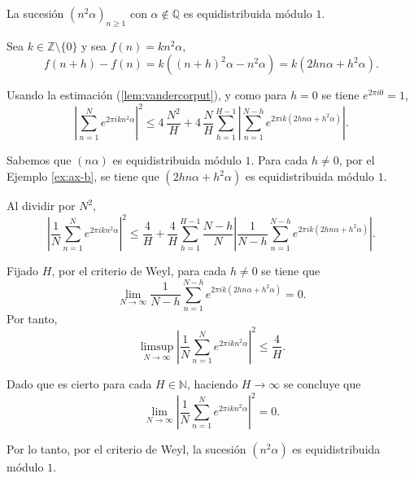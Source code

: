 \begin{example}
    La sucesión $(n^2\alpha)_{n\geq1}$ con $\alpha \notin \mathbb{Q}$ es equidistribuida 
    módulo $1$.
\end{example}

\begin{resolve}
    Sea $k \in \mathbb{Z}\setminus\{0\}$ y sea $f(n)=kn^2\alpha$,
    \[
        f(n+h)-f(n) =
        k((n+h)^2\alpha - n^2\alpha) = 
        k(2hn\alpha + h^2\alpha).
    \]

    Usando la estimación (\ref{lem:vandercorput}), y como para $h=0$ se tiene $e^{2\pi i 0}=1$, 
    \[
        \left|\sum_{n=1}^N e^{2\pi i  k n^2 \alpha}\right|^2 \leq 
        4\,\frac{N^2}{H} + 4\,\frac{N}{H} \sum_{h=1}^{H-1} \left|\sum_{n=1}^{N-h} e^{2\pi i k (2hn\alpha+h^2\alpha)}\right|.
    \]

    Sabemos que $(n\alpha)$ es equidistribuida módulo $1$. Para cada $h \neq 0$, por el Ejemplo 
    \ref{ex:ax-b}, se tiene que $(2hn\alpha+h^2\alpha)$ es equidistribuida módulo $1$.

    Al dividir por $N^2$,
    \[
        \left|\frac{1}{N}\sum_{n=1}^N e^{2\pi i k n^2 \alpha}\right|^2 \leq 
        \frac{4}{H} + \frac{4}{H} \sum_{h=1}^{H-1} \frac{N-h}{N} \left|\frac{1}{N-h}\sum_{n=1}^{N-h} e^{2\pi i k(2hn\alpha+h^2\alpha)}\right|.
    \]

    Fijado $H$, por el criterio de Weyl, para cada $h \neq 0$ se tiene que
    \[
        \lim_{N\to\infty} \frac{1}{N-h}\sum_{n=1}^{N-h} e^{2\pi i k(2hn\alpha+h^2\alpha)} = 0.
    \] 
    Por tanto,
    \[
        \limsup_{N\to\infty} \left| \frac{1}{N} \sum_{n=1}^N e^{2\pi i k n^2 \alpha}\right|^2 \leq \frac{4}{H}.
    \]  

    Dado que es cierto para cada $H\in \mathbb{N}$, haciendo $H\to\infty$ se concluye que
    \[
        \lim_{N\to\infty} \left| \frac{1}{N} \sum_{n=1}^N e^{2\pi i k n^2 \alpha}\right|^2 = 0.
    \]
    
    Por lo tanto, por el criterio de Weyl, la sucesión $(n^2\alpha)$ es equidistribuida módulo $1$.
\end{resolve}